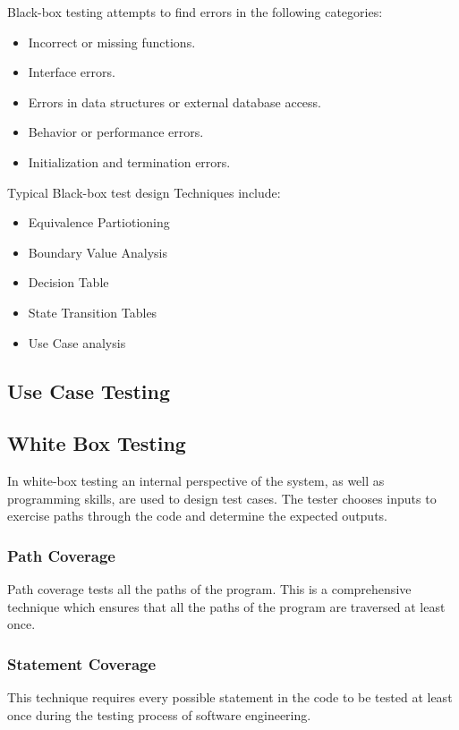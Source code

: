 Black-box testing attempts to find errors in the following categories:
\begin{itemize}
    \item Incorrect or missing functions.
    \item Interface errors.
    \item Errors in data structures or external database access.
    \item Behavior or performance errors.
    \item Initialization and termination errors.
\end{itemize}

Typical Black-box test design Techniques include:
\begin{itemize}
    \item Equivalence Partiotioning
    \item Boundary Value Analysis
    \item Decision Table
    \item State Transition Tables
    \item Use Case analysis
\end{itemize}





\subsection{Use Case Testing}

\subsection{ White Box Testing}
In white-box testing an internal perspective of the system, as well as programming skills, are used to
design test cases. The tester chooses inputs to exercise paths through the code and determine the
expected outputs.



\subsubsection{ Path Coverage}
Path coverage tests all the paths of the program. This is a comprehensive technique which ensures
that all the paths of the program are traversed at least once.
\subsubsection{ Statement Coverage}
This technique requires every possible statement in the code to be tested at least once during the
testing process of software engineering.

